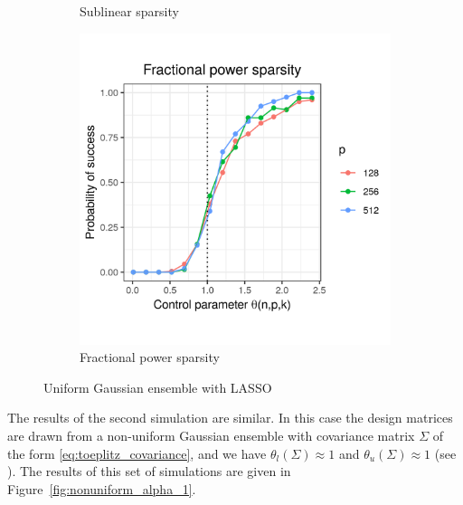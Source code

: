 \documentclass[letterpaper,12pt]{article}
\begin{document}
\begin{figure}[h]
\begin{subfigure}{0.32\textwidth}
    \caption{Sublinear sparsity}
    \label{fig:uniform_sublinear_sparsity_alpha_1}
  \end{subfigure}
  \begin{subfigure}{0.32\textwidth}
    \includegraphics[width=0.9\linewidth]{uniform_fractional_power_sparsity_alpha_1}
    \caption{Fractional power sparsity}
    \label{fig:uniform_fractional_power_sparsity_alpha_1}
  \end{subfigure}
  \caption{Uniform Gaussian ensemble with LASSO}
  \label{fig:uniform_alpha_1}
\end{figure}

The results of the second simulation are similar. In this case the
design matrices are drawn from a non-uniform Gaussian ensemble with
covariance matrix $\Sigma$ of the form \eqref{eq:toeplitz_covariance},
and we have $\theta_l(\Sigma) \approx 1$ and
$\theta_u(\Sigma) \approx 1$ (see \cite{wainwright06}). The results of
this set of simulations are given in
Figure~\ref{fig:nonuniform_alpha_1}.
\end{document}

